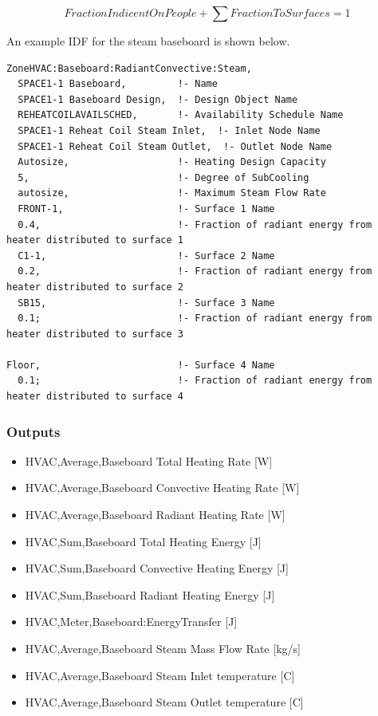 \begin{equation}
FractionIndicentOnPeople + \sum {FractionToSurfaces = 1}
\end{equation}

An example IDF for the steam baseboard is shown below.

\begin{lstlisting}
ZoneHVAC:Baseboard:RadiantConvective:Steam,
  SPACE1-1 Baseboard,         !- Name
  SPACE1-1 Baseboard Design,  !- Design Object Name
  REHEATCOILAVAILSCHED,       !- Availability Schedule Name
  SPACE1-1 Reheat Coil Steam Inlet,  !- Inlet Node Name
  SPACE1-1 Reheat Coil Steam Outlet,  !- Outlet Node Name
  Autosize,                   !- Heating Design Capacity
  5,                          !- Degree of SubCooling
  autosize,                   !- Maximum Steam Flow Rate
  FRONT-1,                    !- Surface 1 Name
  0.4,                        !- Fraction of radiant energy from heater distributed to surface 1
  C1-1,                       !- Surface 2 Name
  0.2,                        !- Fraction of radiant energy from heater distributed to surface 2
  SB15,                       !- Surface 3 Name
  0.1;                        !- Fraction of radiant energy from heater distributed to surface 3

Floor,                        !- Surface 4 Name
  0.1;                        !- Fraction of radiant energy from heater distributed to surface 4
\end{lstlisting}

\subsubsection{Outputs}\label{outputs-1-021}

\begin{itemize}
\item
  HVAC,Average,Baseboard Total Heating Rate {[}W{]}
\item
  HVAC,Average,Baseboard Convective Heating Rate {[}W{]}
\item
  HVAC,Average,Baseboard Radiant Heating Rate {[}W{]}
\item
  HVAC,Sum,Baseboard Total Heating Energy {[}J{]}
\item
  HVAC,Sum,Baseboard Convective Heating Energy {[}J{]}
\item
  HVAC,Sum,Baseboard Radiant Heating Energy {[}J{]}
\item
  HVAC,Meter,Baseboard:EnergyTransfer {[}J{]}
\item
  HVAC,Average,Baseboard Steam Mass Flow Rate {[}kg/s{]}
\item
  HVAC,Average,Baseboard Steam Inlet temperature {[}C{]}
\item
  HVAC,Average,Baseboard Steam Outlet temperature {[}C{]}
\end{itemize}

